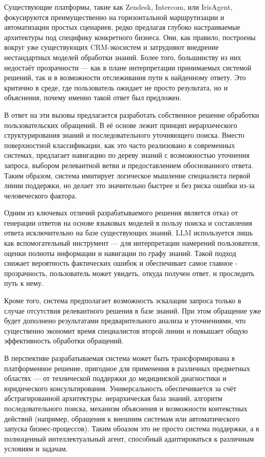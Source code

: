 Существующие платформы, такие как Zendesk, Intercom, или IrisAgent, фокусируются преимущественно на горизонтальной маршрутизации и автоматизации простых сценариев, редко предлагая глубоко настраиваемые архитектуры под специфику конкретного бизнеса. Они, как правило, построены вокруг уже существующих CRM-экосистем и затрудняют внедрение нестандартных моделей обработки знаний. Более того, большинству из них недостаёт прозрачности — как в плане интерпретации принимаемых системой решений, так и в возможности отслеживания пути к найденному ответу. Это критично в среде, где пользователь ожидает не просто результата, но и объяснения, почему именно такой ответ был предложен.

В ответ на эти вызовы предлагается разработать собственное решение обработки пользовательских обращений. В её основе лежит принцип иерархического структурирования знаний и последовательного уточняющего поиска. Вместо поверхностной классификации, как это часто реализовано в современных системах, предлагает навигацию по дереву знаний с возможностью уточнения запроса, выбором релевантной ветви и предоставлением обоснованного ответа. Таким образом, система имитирует логическое мышление специалиста первой линии поддержки, но делает это значительно быстрее и без риска ошибки из-за человеческого фактора.

Одним из ключевых отличий разрабатываемого решения является отказ от генерации ответов на основе языковых моделей в пользу поиска и составления ответа исключительно на базе существующих знаний. LLM используется лишь как вспомогательный инструмент — для интерпретации намерений пользователя, оценки полноты информации и навигации по графу знаний. Такой подход снижает вероятность фактических ошибок и обеспечивает самое главное - прозрачность, пользователь может увидеть, откуда получен ответ, и проследить путь к нему.

Кроме того, система предполагает возможность эскалации запроса только в случае отсутствия релевантного решения в базе знаний. При этом обращение уже будет дополнено результатами предварительного анализа и уточнениями, что существенно экономит время специалистов второй линии и повышает общую эффективность обработки обращений.

В перспективе разрабатываемая система может быть трансформирована в платформенное решение, пригодное для применения в различных предметных областях — от технической поддержки до медицинской диагностики и юридического консультирования. Универсальность обеспечивается за счёт абстрагированной архитектуры: иерархическая база знаний, алгоритм последовательного поиска, механизм объяснения и возможности контекстных действий (например, обращения к внешним системам или автоматического запуска бизнес-процессов). Таким обоазом это не просто система поддержки, а в полноценный интеллектуальный агент, способный адаптироваться к различным условиям и задачам.

